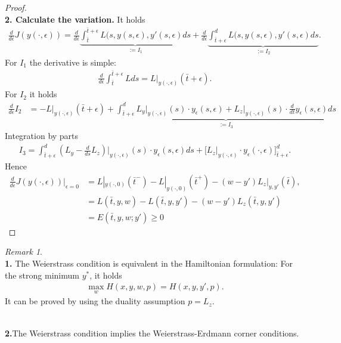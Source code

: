 \documentclass[a4paper,11pt,fleqn]{book}
\theoremstyle{definition}
\theoremstyle{remark}
\newtheorem*{remark}{Remark}
\begin{document}
\begin{proof}
\quad\\
\textbf{2. Calculate the variation.}
It holds
\begin{align*}
	\frac{d}{d\epsilon}J(y(\cdot, \epsilon)) =  \frac{d}{d\epsilon}\underbrace{\int_{\bar{t}}^{\bar{t} + \epsilon} L(s, y(s, \epsilon), y'(s, \epsilon) ds}_{:= I_1} + \frac{d}{d\epsilon} \underbrace{ \int_{\bar{t} + \epsilon}^d L(s, y(s, \epsilon), y'(s, \epsilon) ds}_{:= I_2}. 
\end{align*}
For $I_1$ the derivative is simple:
\begin{align*}
	\frac{d}{d\epsilon}\int_{\bar{t}}^{\bar{t} + \epsilon} L ds = L|_{y(\cdot, \epsilon) }(\bar{t} + \epsilon).
\end{align*}
For $I_2$ it holds
\begin{align*}
	\frac{d}{d\epsilon} I_2 &= -L|_{y(\cdot, \epsilon)}(\bar{t} + \epsilon) + \underbrace{ \int_{\bar{t} + \epsilon}^d L_y\bigg|_{y(\cdot, \epsilon)}(s) \cdot y_\epsilon (s, \epsilon) + L_z\bigg|_{y(\cdot, \epsilon)}(s) \cdot \frac{d}{dt} y_\epsilon(s, \epsilon) ds }_{:= I_3}
\end{align*}
Integration by parts
\begin{align*}
	I_3 = \int_{\bar{t} + \epsilon}^d (L_y - \frac{d}{ds}L_z)\bigg|_{y(\cdot, \epsilon)}(s) \cdot y_\epsilon(s, \epsilon) ds + \bigg[L_z\bigg|_{y(\cdot, \epsilon)} \cdot y_\epsilon(\cdot, \epsilon) \bigg]_{\bar{t} + \epsilon}^d. 
\end{align*}
Hence
\begin{align*}
	\frac{d}{d\epsilon}J(y(\cdot, \epsilon))\bigg|_{\epsilon = 0} &= L|_{y(\cdot, 0)}(\bar{t}^-) -L|_{y(\cdot, 0)}(\bar{t}^+)  - (w - y')L_z|_{y, y'}(\bar{t}), \\
	&= L(\bar{t}, y, w) - L(\bar{t}, y, y') - (w - y')L_z(\bar{t},y, y') \\
	& = E(\bar{t}, y, w; y') \ge 0
\end{align*}



\end{proof}
\begin{remark}
\quad\\
\textbf{1.} The Weierstrass condition is equivalent in the Hamiltonian formulation: For the strong minimum $y^*$, it holds
\begin{align*}
	\max_w H(x, y, w, p) = H(x, y, y', p). 
\end{align*}
It can be proved by using the duality assumption $p = L_z$.

\quad\\
\textbf{2.}The Weierstrass condition implies the Weierstrass-Erdmann corner conditions. 	
\end{remark}
\end{document}
